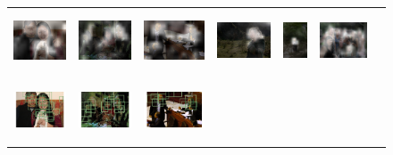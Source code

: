 \begin{figure}[htb]
\begin{tabular}{ccccccc}
      \includegraphics[height=1.8cm]{figures/hm_examples/50s_2008_002067} &
      \includegraphics[height=1.8cm]{figures/hm_examples/50s_2009_004323} &
      \includegraphics[height=1.8cm]{figures/hm_examples/50s_2009_004784} &
      \includegraphics[height=1.8cm]{figures/hm_examples/50s_2009_005222} &
      \includegraphics[height=1.8cm]{figures/hm_examples/50s_2009_002715} &
      \includegraphics[height=1.8cm]{figures/hm_examples/50s_2010_005967} \\
      \includegraphics[height=1.8cm]{figures/hm_examples/50s_bbox_2008_002067} &
      \includegraphics[height=1.8cm]{figures/hm_examples/50s_bbox_2009_004323} &
      \includegraphics[height=1.8cm]{figures/hm_examples/50s_bbox_2009_004784} &

\end{tabular}
\end{figure}
